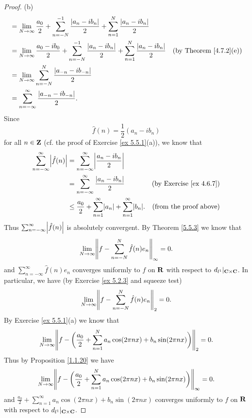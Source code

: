 \begin{proof}{(b)}
\begin{align*}
         & = \lim_{N \to \infty} \frac{a_0}{2} + \sum_{n = -N}^{-1} \frac{\left\lvert a_n - i b_n\right\rvert}{2} + \sum_{n = 1}^N \frac{\left\lvert a_n - i b_n\right\rvert}{2}                                                           \\
         & = \lim_{N \to \infty} \frac{a_0 - i b_0}{2} + \sum_{n = -N}^{-1} \frac{\left\lvert a_n - i b_n\right\rvert}{2} + \sum_{n = 1}^N \frac{\left\lvert a_n - i b_n\right\rvert}{2} & \text{(by Theorem \ref{4.7.2}(e))}              \\
         & = \lim_{N \to \infty} \sum_{n = -N}^N \frac{\left\lvert a_{-n} - i b_{-n}\right\rvert}{2}                                                                                                                     \\
         & = \sum_{n = -\infty}^\infty \frac{\left\lvert a_{-n} - i b_{-n}\right\rvert}{2}.
    \end{align*}
    Since
    \[
        \hat{f}(n) = \frac{1}{2} (a_n - i b_n)
    \]
    for all \(n \in \mathbf{Z}\) (cf. the proof of Exercise \ref{ex 5.5.1}(a)), we know that
    \begin{align*}
        \sum_{n = -\infty}^\infty \abs{\hat{f}(n)} & = \sum_{n = -\infty}^\infty \abs{\frac{a_n - i b_n}{2}}                                                                   \\
                                                   & = \sum_{n = -\infty}^\infty \frac{\abs{a_n - i b_n}}{2}                             & \text{(by Exercise \ref{ex 4.6.7})} \\
                                                   & \leq \frac{a_0}{2} + \sum_{n = 1}^\infty \abs{a_n} + \sum_{n = 1}^\infty \abs{b_n}. & \text{(from the proof above)}
    \end{align*}
    Thus \(\sum_{n = -\infty}^\infty \abs{\hat{f}(n)}\) is absolutely convergent.
    By Theorem \ref{5.5.3} we know that
    \[
        \lim_{N \to \infty} \norm*{f - \sum_{n = -N}^N \hat{f}(n) e_n}_{\infty} = 0.
    \]
    and \(\sum_{n = -\infty}^\infty \hat{f}(n) e_n\) converges uniformly to \(f\) on \(\mathbf{R}\) with respect to \(d_{l^1}|_{\mathbf{C} \times \mathbf{C}}\).
    In particular, we have (by Exercise \ref{ex 5.2.3} and squeeze test)
    \[
        \lim_{N \to \infty} \norm*{f - \sum_{n = -N}^N \hat{f}(n) e_n}_2 = 0.
    \]
    By Exercise \ref{ex 5.5.1}(a) we know that
    \[
        \lim_{N \to \infty} \norm*{f - \bigg(\frac{a_0}{2} + \sum_{n = 1}^N a_n \cos(2 \pi n x) + b_n \sin(2 \pi n x)\bigg)}_2 = 0.
    \]
    Thus by Proposition \ref{1.1.20} we have
    \[
        \lim_{N \to \infty} \norm*{f - \bigg(\frac{a_0}{2} + \sum_{n = 1}^N a_n \cos(2 \pi n x) + b_n \sin(2 \pi n x)\bigg)}_{\infty} = 0.
    \]
    and \(\frac{a_0}{2} + \sum_{n = 1}^\infty a_n \cos(2 \pi n x) + b_n \sin(2 \pi n x)\) converges uniformly to \(f\) on \(\mathbf{R}\) with respect to \(d_{l^1}|_{\mathbf{C} \times \mathbf{C}}\).
\end{proof}

